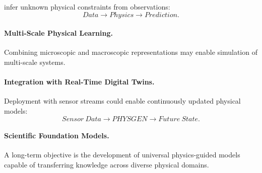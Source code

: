 infer unknown physical constraints from observations: \begin{equation} Data \rightarrow Physics \rightarrow Prediction. \end{equation} \paragraph{Multi-Scale Physical Learning.} Combining microscopic and macroscopic representations may enable simulation of multi-scale systems. \paragraph{Integration with Real-Time Digital Twins.} Deployment with sensor streams could enable continuously updated physical models: \begin{equation} Sensor\ Data \rightarrow PHYSGEN \rightarrow Future\ State. \end{equation} \paragraph{Scientific Foundation Models.} A long-term objective is the development of universal physics-guided models capable of transferring knowledge across diverse physical domains. %